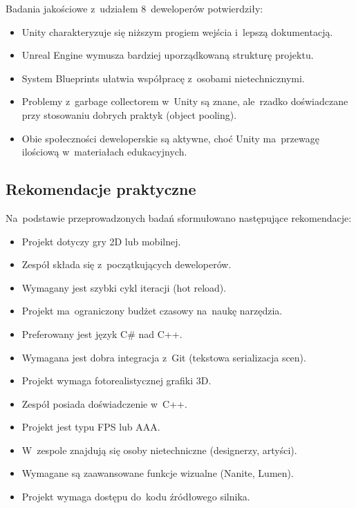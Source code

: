 Badania jakościowe z~udziałem 8~deweloperów potwierdziły:

\begin{itemize}
    \item Unity charakteryzuje się niższym progiem wejścia i~lepszą dokumentacją.
    \item Unreal Engine wymusza bardziej uporządkowaną strukturę projektu.
    \item System Blueprints ułatwia współpracę z~osobami nietechnicznymi.
    \item Problemy z~garbage collectorem w~Unity są znane, ale~rzadko doświadczane przy stosowaniu dobrych praktyk (object pooling).
    \item Obie społeczności deweloperskie są aktywne, choć Unity ma~przewagę ilościową w~materiałach edukacyjnych.
\end{itemize}

\subsection{Rekomendacje praktyczne}

Na~podstawie przeprowadzonych badań sformułowano następujące rekomendacje:


\begin{itemize}
    \item Projekt dotyczy gry 2D lub mobilnej.
    \item Zespół składa się z~początkujących deweloperów.
    \item Wymagany jest szybki cykl iteracji (hot reload).
    \item Projekt ma~ograniczony budżet czasowy na~naukę narzędzia.
    \item Preferowany jest język C\# nad C++.
    \item Wymagana jest dobra integracja z~Git (tekstowa serializacja scen).
\end{itemize}


\begin{itemize}
    \item Projekt wymaga fotorealistycznej grafiki 3D.
    \item Zespół posiada doświadczenie w~C++.
    \item Projekt jest typu FPS lub AAA.
    \item W~zespole znajdują się osoby nietechniczne (designerzy, artyści).
    \item Wymagane są zaawansowane funkcje wizualne (Nanite, Lumen).
    \item Projekt wymaga dostępu do~kodu źródłowego silnika.
\end{itemize}

